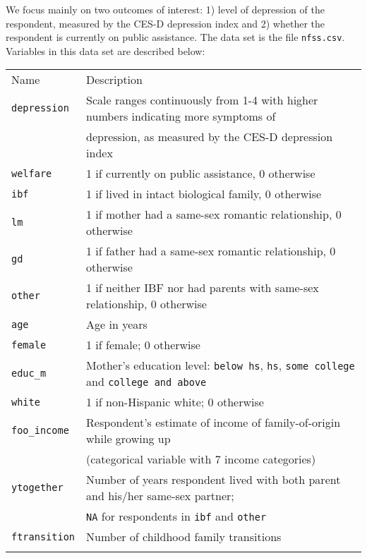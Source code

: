 \documentclass[]{article}
\begin{document}
We focus mainly on two outcomes of interest: 1) level of depression of
the respondent, measured by the CES-D depression index and 2) whether
the respondent is currently on public assistance. The data set is the
file \texttt{nfss.csv}. Variables in this data set are described below:

\begin{longtable}[c]{@{}ll@{}}
\toprule\addlinespace
Name & Description
\\\addlinespace
\midrule\endhead
\texttt{depression} & Scale ranges continuously from 1-4 with higher
numbers indicating more symptoms of
\\\addlinespace
& depression, as measured by the CES-D depression index
\\\addlinespace
\texttt{welfare} & 1 if currently on public assistance, 0 otherwise
\\\addlinespace
\texttt{ibf} & 1 if lived in intact biological family, 0 otherwise
\\\addlinespace
\texttt{lm} & 1 if mother had a same-sex romantic relationship, 0
otherwise
\\\addlinespace
\texttt{gd} & 1 if father had a same-sex romantic relationship, 0
otherwise
\\\addlinespace
\texttt{other} & 1 if neither IBF nor had parents with same-sex
relationship, 0 otherwise
\\\addlinespace
\texttt{age} & Age in years
\\\addlinespace
\texttt{female} & 1 if female; 0 otherwise
\\\addlinespace
\texttt{educ\_m} & Mother's education level: \texttt{below hs},
\texttt{hs}, \texttt{some college} and \texttt{college and above}
\\\addlinespace
\texttt{white} & 1 if non-Hispanic white; 0 otherwise
\\\addlinespace
\texttt{foo\_income} & Respondent's estimate of income of
family-of-origin while growing up
\\\addlinespace
& (categorical variable with 7 income categories)
\\\addlinespace
\texttt{ytogether} & Number of years respondent lived with both parent
and his/her same-sex partner;
\\\addlinespace
& \texttt{NA} for respondents in \texttt{ibf} and \texttt{other}
\\\addlinespace
\texttt{ftransition} & Number of childhood family transitions
\\\addlinespace
\bottomrule
\end{longtable}
\end{document}
